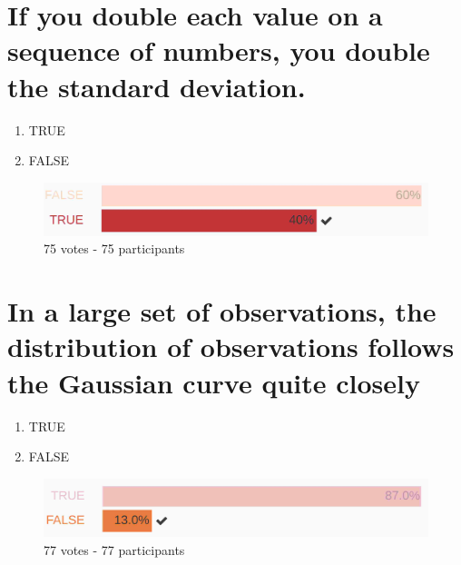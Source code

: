 \documentclass[letterpaper,10pt,twoside,printwatermark=false]{pinp}
\providecommand{\tightlist}{%
  \setlength{\itemsep}{0pt}\setlength{\parskip}{0pt}}
\begin{document}
\section{If you double each value on a sequence of numbers, you double
the standard
deviation.}\label{if-you-double-each-value-on-a-sequence-of-numbers-you-double-the-standard-deviation.}

\begin{enumerate}
\def\labelenumi{\arabic{enumi}.}
\tightlist
\item
  TRUE
\item
  FALSE
\end{enumerate}

\begin{figure}[H]
  \begin{center}
    \includegraphics[scale=0.15]{q6.jpg} 
  \end{center}
  \caption{75 votes - 75 participants}
\end{figure}

\newpage

\section{In a large set of observations, the distribution of
observations follows the Gaussian curve quite
closely}\label{in-a-large-set-of-observations-the-distribution-of-observations-follows-the-gaussian-curve-quite-closely}

\begin{enumerate}
\def\labelenumi{\arabic{enumi}.}
\tightlist
\item
  TRUE
\item
  FALSE
\end{enumerate}

\begin{figure}[H]
  \begin{center}
    \includegraphics[scale=0.15]{q7.jpg} 
  \end{center}
  \caption{77 votes - 77 participants}
\end{figure}
\end{document}
